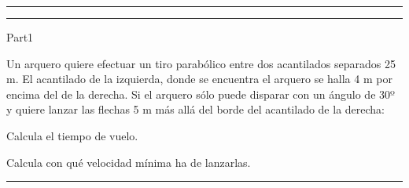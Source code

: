 \documentclass[10pt]{article}
\begin{document}
\vspace*{-2.7cm}
\noindent\rule{1.05\textwidth}{0,4pt}
\noindent{} 
\vspace{-0,35cm}
\noindent{}\vspace{0,65cm}
\noindent {}\vspace{-0,25cm}
\noindent\rule{1.05\textwidth}{0,4pt}
\vspace*{-1.5cm}

\makeatletter
\renewcommand{\eqleftmargin}[2]{\makebox[0pt][r]{\marginpointtext{#1}{#2}%
    \setlength{\@tempdima}{\eqemargin}%
    \hspace*{\@tempdima}}}
\makeatother
\lhead{}
\chead{}
\rhead{}

\begin{exam}{Part1}
\forceNoColor
\useFillerDefault
\fillTypeDots
{}
\eqWLSpacing{18pt}
\vspace*{1cm}\begin{problem*}[10ea]
Un arquero quiere efectuar un tiro parabólico entre dos acantilados separados 25 m. El acantilado de la izquierda, donde se encuentra el arquero se halla 4 m por encima del de la derecha. Si el arquero sólo puede disparar con un ángulo de 30º y quiere lanzar las flechas 5 m más allá del borde del acantilado de la derecha: 
\begin{parts}
\item Calcula el tiempo de vuelo. 
\item Calcula con qué velocidad mínima ha de lanzarlas.
\end{parts}
\end{problem*}\vfill
\hrule
\vspace*{0.2cm}
\end{exam} 
\end{document}
